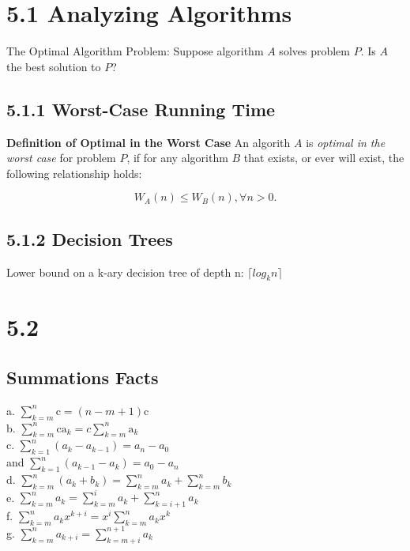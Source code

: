 \documentclass[10pt,twocolumn]{article}
\begin{document}
	\section*{5.1 Analyzing Algorithms}
	
	The Optimal Algorithm Problem: Suppose algorithm $A$ solves problem $P$. Is $A$ the best solution to $P$?
	
	\subsection*{5.1.1 Worst-Case Running Time}
	
	\textbf{Definition of Optimal in the Worst Case} An algorith $A$ is \emph{optimal in the worst case} for problem $P$, if for any algorithm $B$ that exists, or ever will exist, the following relationship holds:
	
	\[W_A(n)\leq W_B(n),\forall n>0.\]
	
	\subsection*{5.1.2 Decision Trees}
	
	Lower bound on a k-ary decision tree of depth n: $\lceil log_k n\rceil$
	

	\section*{5.2}
	
	\subsection*{Summations Facts}
	a. $\displaystyle \sum_{k=m}^n \mathrm{c} = (n - m + 1)\mathrm{c}$ \\
	b. $\displaystyle \sum_{k=m}^n \mathrm{c a_\mathit{k}} = c
	\displaystyle\sum_{k=m}^n \mathrm{a_\mathit{k}}$\\
	c. $\displaystyle\sum_{k=1}^n (a_\mathit{k} - a_\mathit{k - 1}) =
	a_\mathit{n} - a_\mathit{0}$ \\
		and $ \displaystyle\sum_{k=1}^n
	(a_\mathit{k - 1} - a_\mathit{k}) = a_\mathit{0} - a_\mathit{n}$\\
	d. $\displaystyle\sum_{k=m}^n (a_\mathit{k} + b_\mathit{k}) =
	\displaystyle\sum_{k=m}^n a_\mathit{k} + \displaystyle\sum_{k=m}^n
	b_\mathit{k}$\\
	e. $\displaystyle\sum_{k=m}^n a_\mathit{k} = \displaystyle\sum_{k=m}^i
	a_\mathit{k} +  \displaystyle\sum_{k=i+1}^n a_\mathit{k}$\\
	f. $\displaystyle\sum_{k=m}^n a_\mathit{k}x^\mathit{k+i} = 
	x^\mathit{i} \sum_{k=m}^n a_\mathit{k}x^\mathit{k}$\\
	g. $\displaystyle\sum_{k=m}^n a_\mathit{k+i} = \displaystyle\sum_{k=m+i}^{n+1}
	a_\mathit{k}$\\
\end{document}
